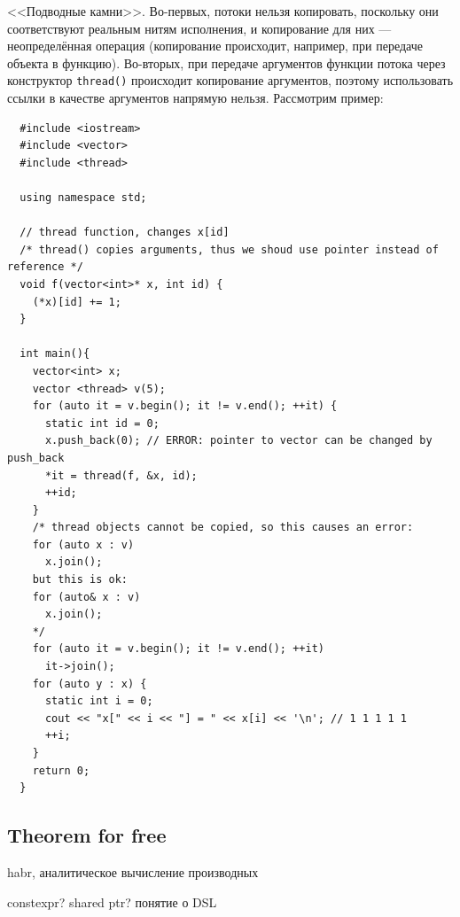 \documentclass{book}
\begin{document}
<<Подводные камни>>. Во-первых, потоки нельзя копировать, поскольку они
соответствуют реальным нитям исполнения, и копирование для них ---
неопределённая операция (копирование происходит, например, при передаче объекта
в функцию). Во-вторых, при передаче аргументов функции потока через конструктор
\texttt{thread()} происходит копирование аргументов, поэтому
использовать ссылки в качестве аргументов напрямую нельзя. Рассмотрим пример:
\begin{verbatim}
  #include <iostream>
  #include <vector>
  #include <thread>

  using namespace std;

  // thread function, changes x[id]
  /* thread() copies arguments, thus we shoud use pointer instead of reference */
  void f(vector<int>* x, int id) {
    (*x)[id] += 1;
  }

  int main(){
    vector<int> x;
    vector <thread> v(5);
    for (auto it = v.begin(); it != v.end(); ++it) {
      static int id = 0;
      x.push_back(0); // ERROR: pointer to vector can be changed by push_back
      *it = thread(f, &x, id);
      ++id;
    }
    /* thread objects cannot be copied, so this causes an error:
    for (auto x : v)
      x.join();
    but this is ok:
    for (auto& x : v)
      x.join();
    */
    for (auto it = v.begin(); it != v.end(); ++it)
      it->join();
    for (auto y : x) {
      static int i = 0;
      cout << "x[" << i << "] = " << x[i] << '\n'; // 1 1 1 1 1
      ++i;
    }
    return 0;
  }
\end{verbatim}

\subsection{Theorem for free}

habr, аналитическое вычисление производных

constexpr?
shared ptr?
понятие о DSL



\end{document}

